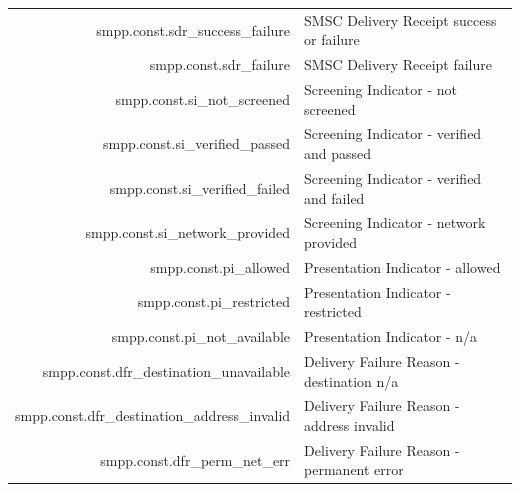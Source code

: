 \documentclass[a4paper,latin]{paper}
\begin{document}
\begin{tabularx}{\linewidth}{ | >{\ttfamily} r | >{\ttfamily} X |}
	smpp.const.sdr\_success\_failure		& SMSC Delivery Receipt success or failure\\
	smpp.const.sdr\_failure				& SMSC Delivery Receipt failure\\
	smpp.const.si\_not\_screened			& Screening Indicator - not screened\\
	smpp.const.si\_verified\_passed			& Screening Indicator - verified and passed\\
	smpp.const.si\_verified\_failed			& Screening Indicator - verified and failed\\
	smpp.const.si\_network\_provided		& Screening Indicator - network provided\\
	smpp.const.pi\_allowed				& Presentation Indicator - allowed\\
	smpp.const.pi\_restricted			& Presentation Indicator - restricted\\
	smpp.const.pi\_not\_available			& Presentation Indicator - n/a\\
	smpp.const.dfr\_destination\_unavailable	& Delivery Failure Reason - destination n/a\\
	smpp.const.dfr\_destination\_address\_invalid	& Delivery Failure Reason - address invalid\\
	smpp.const.dfr\_perm\_net\_err			& Delivery Failure Reason - permanent error\\
	\hline
\end{tabularx}%
\clearpage
\end{document}
